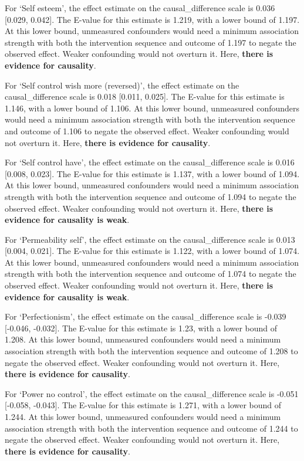 \documentclass[
  single column]{article}
\begin{document}
For `Self esteem', the effect estimate on the causal\_difference scale
is 0.036 {[}0.029, 0.042{]}. The E-value for this estimate is 1.219,
with a lower bound of 1.197. At this lower bound, unmeasured confounders
would need a minimum association strength with both the intervention
sequence and outcome of 1.197 to negate the observed effect. Weaker
confounding would not overturn it. Here, \textbf{there is evidence for
causality}.

For `Self control wish more (reversed)', the effect estimate on the
causal\_difference scale is 0.018 {[}0.011, 0.025{]}. The E-value for
this estimate is 1.146, with a lower bound of 1.106. At this lower
bound, unmeasured confounders would need a minimum association strength
with both the intervention sequence and outcome of 1.106 to negate the
observed effect. Weaker confounding would not overturn it. Here,
\textbf{there is evidence for causality}.

For `Self control have', the effect estimate on the causal\_difference
scale is 0.016 {[}0.008, 0.023{]}. The E-value for this estimate is
1.137, with a lower bound of 1.094. At this lower bound, unmeasured
confounders would need a minimum association strength with both the
intervention sequence and outcome of 1.094 to negate the observed
effect. Weaker confounding would not overturn it. Here, \textbf{there is
evidence for causality is weak}.

For `Permeability self', the effect estimate on the causal\_difference
scale is 0.013 {[}0.004, 0.021{]}. The E-value for this estimate is
1.122, with a lower bound of 1.074. At this lower bound, unmeasured
confounders would need a minimum association strength with both the
intervention sequence and outcome of 1.074 to negate the observed
effect. Weaker confounding would not overturn it. Here, \textbf{there is
evidence for causality is weak}.

For `Perfectionism', the effect estimate on the causal\_difference scale
is -0.039 {[}-0.046, -0.032{]}. The E-value for this estimate is 1.23,
with a lower bound of 1.208. At this lower bound, unmeasured confounders
would need a minimum association strength with both the intervention
sequence and outcome of 1.208 to negate the observed effect. Weaker
confounding would not overturn it. Here, \textbf{there is evidence for
causality}.

For `Power no control', the effect estimate on the causal\_difference
scale is -0.051 {[}-0.058, -0.043{]}. The E-value for this estimate is
1.271, with a lower bound of 1.244. At this lower bound, unmeasured
confounders would need a minimum association strength with both the
intervention sequence and outcome of 1.244 to negate the observed
effect. Weaker confounding would not overturn it. Here, \textbf{there is
evidence for causality}.
\end{document}
